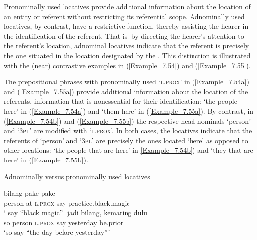 {Pronominally used locatives provide additional information about the location of an entity or referent without restricting its referential scope. Adnominally used locatives, by contrast, have a restrictive function, thereby assisting the hearer in the identification of the referent. That is, by directing the hearer’s attention to the referent’s location, adnominal locatives indicate that the referent is precisely the one situated in the location designated by the . This distinction is illustrated with the (near) contrastive examples in (\ref{Example_7.54}) and (\ref{Example_7.55}).



The prepositional phrases with pronominally used  ‘\textsc{l.prox}’ in (\ref{Example_7.54a}) and (\ref{Example_7.55a}) provide additional information about the location of the referents, information that is nonessential for their identification:  ‘the people here’ in (\ref{Example_7.54a}) and  ‘them here’ in (\ref{Example_7.55a}). By contrast, in (\ref{Example_7.54b}) and (\ref{Example_7.55b}) the respective head nominals  ‘person’ and  ‘\textsc{3pl}’ are modified with  ‘\textsc{l.prox}’. In both cases, the locatives indicate that the referents of  ‘person’ and  ‘\textsc{3pl}’ are precisely the ones located  ‘here’ as opposed to other locations:  ‘the people that are here’ in \ref{Example_7.54b}) and  ‘they that are here’ in (\ref{Example_7.55b}).


\begin{styleExampleTitle}
Adnominally versus pronominally used locatives
\end{styleExampleTitle}

\ea
\label{Example_7.54}
\ea
\label{Example_7.54a}
 {} {} {bilang} {pake-pake}\\ %
   person  at  \textsc{l.prox}  say  practice.black.magic\\
\glt ‘ say ``black magic''' \textstyleExampleSource{[081006-022-CvEx.0028]}
\vspace{10pt}
\ex
\label{Example_7.54b}
\gll  jadi      bilang,  kemaring  dulu\\
   so  person  \textsc{l.prox}  say  yesterday  be.prior\\
\glt ‘so  say ``the day before yesterday''' \textstyleExampleSource{[081006-019-Cv.0015]}
\z
\z

}
